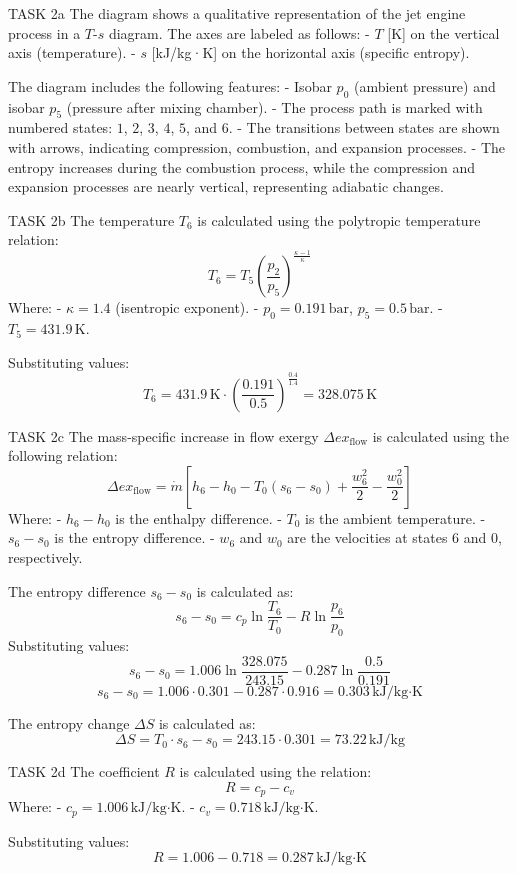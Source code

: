 TASK 2a  
The diagram shows a qualitative representation of the jet engine process in a \( T \)-\( s \) diagram. The axes are labeled as follows:  
- \( T \) [K] on the vertical axis (temperature).  
- \( s \) [kJ/kg·K] on the horizontal axis (specific entropy).  

The diagram includes the following features:  
- Isobar \( p_0 \) (ambient pressure) and isobar \( p_5 \) (pressure after mixing chamber).  
- The process path is marked with numbered states: \( 1 \), \( 2 \), \( 3 \), \( 4 \), \( 5 \), and \( 6 \).  
- The transitions between states are shown with arrows, indicating compression, combustion, and expansion processes.  
- The entropy increases during the combustion process, while the compression and expansion processes are nearly vertical, representing adiabatic changes.  

TASK 2b  
The temperature \( T_6 \) is calculated using the polytropic temperature relation:  
\[
T_6 = T_5 \left( \frac{p_2}{p_5} \right)^{\frac{\kappa - 1}{\kappa}}
\]  
Where:  
- \( \kappa = 1.4 \) (isentropic exponent).  
- \( p_0 = 0.191 \, \text{bar} \), \( p_5 = 0.5 \, \text{bar} \).  
- \( T_5 = 431.9 \, \text{K} \).  

Substituting values:  
\[
T_6 = 431.9 \, \text{K} \cdot \left( \frac{0.191}{0.5} \right)^{\frac{0.4}{1.4}} = 328.075 \, \text{K}
\]  

TASK 2c  
The mass-specific increase in flow exergy \( \Delta ex_{\text{flow}} \) is calculated using the following relation:  
\[
\Delta ex_{\text{flow}} = \dot{m} \left[ h_6 - h_0 - T_0 (s_6 - s_0) + \frac{w_6^2}{2} - \frac{w_0^2}{2} \right]
\]  
Where:  
- \( h_6 - h_0 \) is the enthalpy difference.  
- \( T_0 \) is the ambient temperature.  
- \( s_6 - s_0 \) is the entropy difference.  
- \( w_6 \) and \( w_0 \) are the velocities at states 6 and 0, respectively.  

The entropy difference \( s_6 - s_0 \) is calculated as:  
\[
s_6 - s_0 = c_p \ln \frac{T_6}{T_0} - R \ln \frac{p_6}{p_0}
\]  
Substituting values:  
\[
s_6 - s_0 = 1.006 \ln \frac{328.075}{243.15} - 0.287 \ln \frac{0.5}{0.191}
\]  
\[
s_6 - s_0 = 1.006 \cdot 0.301 - 0.287 \cdot 0.916 = 0.303 \, \text{kJ/kg·K}
\]  

The entropy change \( \Delta S \) is calculated as:  
\[
\Delta S = T_0 \cdot s_6 - s_0 = 243.15 \cdot 0.301 = 73.22 \, \text{kJ/kg}
\]  

TASK 2d  
The coefficient \( R \) is calculated using the relation:  
\[
R = c_p - c_v
\]  
Where:  
- \( c_p = 1.006 \, \text{kJ/kg·K} \).  
- \( c_v = 0.718 \, \text{kJ/kg·K} \).  

Substituting values:  
\[
R = 1.006 - 0.718 = 0.287 \, \text{kJ/kg·K}
\]